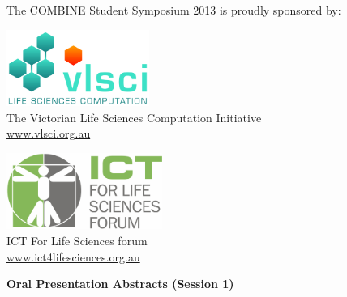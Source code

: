\documentclass[10pt,]{article}
\begin{document}
\vspace{5ex}

\begin{minipage}[c]{0.8\linewidth}
    \centering
    The COMBINE Student Symposium 2013 is proudly sponsored by:\\[3ex]
    \begin{varwidth}[t]{0.45\linewidth}
        \centering
        \includegraphics[height=25mm,valign=M]{./images/logo_vlsci_3508x1890.jpg}\\[2ex]
        The Victorian Life Sciences Computation Initiative\\
        \href{http://www.vlsci.org.au}{www.vlsci.org.au}
    \end{varwidth}
    \qquad
    \begin{varwidth}[t]{0.45\linewidth}
        \centering
        \includegraphics[height=25mm,valign=M]{./images/ICT-for-Life-Sciences-Forum-logo.png}\\[2ex]
        ICT For Life Sciences forum\\
        \href{http://ict4lifesciences.org.au/}{www.ict4lifesciences.org.au}
    \end{varwidth}
    
\end{minipage}

\vfill
\pagebreak
\null
\vfill

\small

{\Large\bfseries\centering Oral Presentation Abstracts (Session 1)}\\[3ex]
\end{document}
